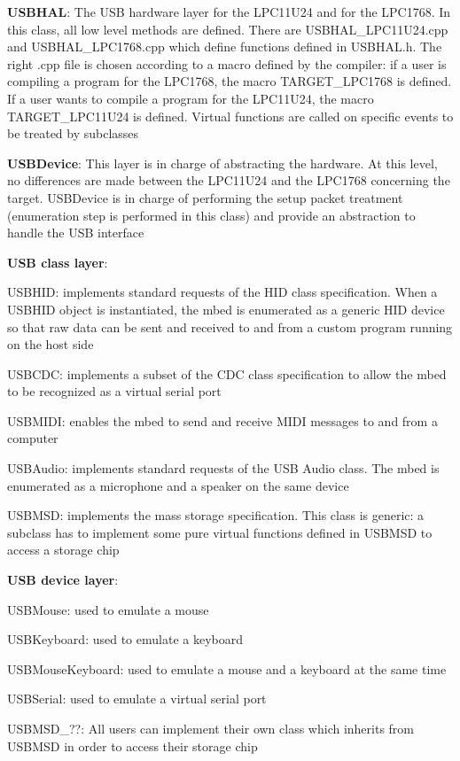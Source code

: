 \documentclass[pdftex,10pt,a4paper]{report}
\newenvironment{packed_item}{
\begin{itemize}
  \setlength{\itemsep}{1pt}
  \setlength{\parskip}{0pt}
  \setlength{\parsep}{0pt}
}{\end{itemize}}
\begin{document}
\begin{packed_item}

	\item \textbf{USBHAL}: The USB hardware layer for the LPC11U24 and for the LPC1768. In this class, all low level methods are defined. There are USBHAL\_LPC11U24.cpp and USBHAL\_LPC1768.cpp which define functions defined in USBHAL.h. The right .cpp file is chosen according to a macro defined by the compiler: if a user is compiling a program for the LPC1768, the macro TARGET\_LPC1768 is defined. If a user wants to compile a program for the LPC11U24, the macro TARGET\_LPC11U24 is defined. Virtual functions are called on specific events to be treated by subclasses
	
	\item \textbf{USBDevice}: This layer is in charge of abstracting the hardware. At this level, no differences are made between the LPC11U24 and the LPC1768 concerning the target. USBDevice is in charge of performing the setup packet treatment (enumeration step is performed in this class) and provide an abstraction to handle the USB interface

	\item \textbf{USB class layer}:
		\begin{packed_item}
			\item USBHID: implements standard requests of the HID class specification. When a USBHID object is instantiated, the mbed is enumerated as a generic HID device so that raw data can be sent and received to and from a custom program running on the host side
			\item USBCDC: implements a subset of the CDC class specification to allow the mbed to be recognized as a virtual serial port
			\item USBMIDI: enables the mbed to send and receive MIDI messages to and from a computer
			\item USBAudio: implements standard requests of the USB Audio class. The mbed is enumerated as a microphone and a speaker on the same device
			\item USBMSD: implements the mass storage specification. This class is generic: a subclass has to implement some pure virtual functions defined in USBMSD to access a storage chip
		\end{packed_item}
		
	\item \textbf{USB device layer}:
		\begin{packed_item}
			\item USBMouse: used to emulate a mouse
			\item USBKeyboard: used to emulate a keyboard
			\item USBMouseKeyboard: used to emulate a mouse and a keyboard at the same time
			\item USBSerial: used to emulate a virtual serial port
			\item USBMSD\_??: All users can implement their own class which inherits from USBMSD in order to access their storage chip
		\end{packed_item}
	
\end{packed_item}
\end{document}
